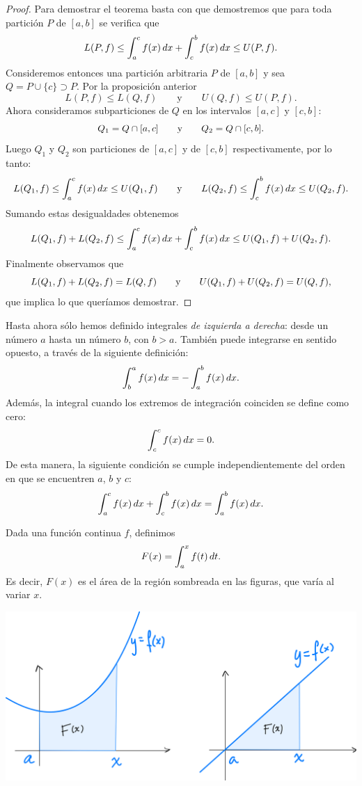 \begin{proof}
  Para demostrar el teorema basta con que demostremos que para toda partición $P$ de $[a,b]$ se verifica que
  \[
  L(P,f) \le \int_a^c f(x)\,dx + \int_c^b f(x)\,dx \le U(P,f).
  \]
  Consideremos entonces una partición arbitraria $P$ de $[a,b]$ y sea $Q=P\cup\{c\}\supset P$.
  Por la proposición anterior 
  \[
  L(P,f) \le L(Q,f)
  \qquad\text{y}\qquad
  U(Q,f) \le U(P,f).
  \]
  Ahora consideramos subparticiones de $Q$ en los intervalos $[a,c]$ y $[c,b]$:
  \[
  Q_1 = Q\cap[a,c]\qquad\text y\qquad 
  Q_2 = Q\cap[c,b].
  \]
  Luego $Q_1$ y $Q_2$ son particiones de $[a,c]$ y de $[c,b]$ respectivamente, por lo tanto:
  \[
  L(Q_1,f)\le \int_a^c f(x)\,dx \le U(Q_1,f)
  \qquad\text{y}\qquad
  L(Q_2,f)\le \int_c^b f(x)\,dx \le U(Q_2,f).
  \]
  Sumando estas desigualdades obtenemos
  \[
  L(Q_1,f)+L(Q_2,f)\le \int_a^c f(x)\,dx + \int_c^b f(x)\,dx \le U(Q_1,f)+U(Q_2,f).
  \]
  Finalmente observamos que 
  \[
    L(Q_1,f)+L(Q_2,f) = L(Q,f)
    \qquad\text y\qquad
    U(Q_1,f)+U(Q_2,f) = U(Q,f),
  \]
  que implica lo que queríamos demostrar.
  \end{proof}

  Hasta ahora sólo hemos definido integrales \emph{de izquierda a derecha}: desde un número $a$ hasta un número $b$, con $b>a$. También puede integrarse en sentido opuesto, a través de la siguiente definición:
  \[
  \int_b^a f(x)\,dx 
  = -\int_a^b f(x)\,dx .
  \]
  Además, la integral cuando los extremos de integración coinciden se define como cero:
  \[
  \int_c^c f(x)\,dx = 0.
  \]
  De esta manera, la siguiente condición se cumple independientemente del orden en que se encuentren $a$, $b$ y $c$:
  \[
    \int_a^c f(x)\,dx + \int_c^b f(x)\,dx=\int_a^b f(x)\,dx .
  \]

\noindent
\begin{minipage}{.4\textwidth}  Dada una función continua $f$, definimos 
  \[
  F(x)=\int_a^x f(t)\,dt.
  \]
  Es decir, $F(x)$ es el área de la región sombreada en las figuras, que varía al variar $x$.
\end{minipage}
\begin{minipage}{.6\textwidth}
  \begin{center}
    \includegraphics[width=.95\textwidth]{pics/integral-hasta-x.png}
  \end{center}
\end{minipage}

